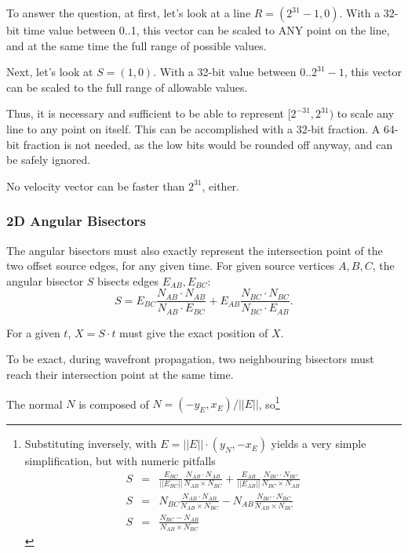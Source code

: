 \documentclass[12pt,a4paper,oneside,openany]{article}
\begin{document}
To answer the question, at first, let's look at a line $R = (2^{31}-1,0)$. With a 32-bit time value between 0..1, this vector can be scaled to ANY point on the line, and at the same time the full range of possible values.

Next, let's look at $S = (1,0)$. With a 32-bit value between $0..2^{31}-1$, this vector can be scaled to the full range of allowable values.

Thus, it is necessary and sufficient to be able to represent $[2^{-31}, 2^{31})$ to scale any line to any point on itself. This can be accomplished with a 32-bit fraction. A 64-bit fraction is not needed, as the low bits would be rounded off anyway, and can be safely ignored.

No velocity vector can be faster than $2^{31}$, either.

\subsubsection{2D Angular Bisectors}

The angular bisectors must also exactly represent the intersection point of the two offset source edges, for any given time. For given source vertices $A,B,C$, the angular bisector $S$ bisects edges $E_{AB}, E_{BC}$:
$$ S = E_{BC} \frac{N_{AB} \cdot N_{AB}}{N_{AB} \cdot E_{BC}} +  E_{AB} \frac{N_{BC} \cdot N_{BC}}{N_{BC} \cdot E_{AB}}.$$

For a given $t$, $X = S \cdot t$ must give the exact position of $X$.

To be exact, during wavefront propagation, two neighbouring bisectors must reach their intersection point at the same time.

The normal $N$ is composed of $N = (-y_E, x_E) / ||E||$, so\footnote{
Substituting inversely, with $E = ||E||\cdot(y_N, -x_E)$ yields a very simple simplification, but with numeric pitfalls
\begin{eqnarray*}
S &=& \frac{E_{BC}}{||E_{BC}||} \frac{N_{AB} \cdot N_{AB}}{N_{AB} \times N_{BC}} +  \frac{E_{AB}}{||E_{AB}||} \frac{N_{BC} \cdot N_{BC}}{N_{BC} \times N_{AB}} \\
S &=& {N_{BC}} \frac{N_{AB} \cdot N_{AB}}{N_{AB} \times N_{BC}} - N_{AB} \frac{N_{BC} \cdot N_{BC}}{N_{AB} \times N_{BC}} \\
S &=& \frac{N_{BC} - N_{AB}}{N_{AB} \times N_{BC}}
\end{eqnarray*}
}
\end{document}
